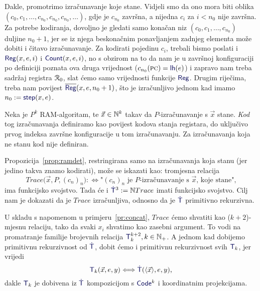 Dakle, promotrimo izračunavanje koje stane. Vidjeli smo da ono mora biti oblika $(c_0,c_1,\dotsc,c_{n_0},c_{n_0},c_{n_0},\dotsc)$, gdje je $c_{n_0}$ završna, a nijedna $c_i$ za $i<n_0$ nije završna. Za potrebe kodiranja, dovoljno je gledati samo konačan niz $(c_0,c_1,\dotsc,c_{n_0})$ duljine $n_0+1$, jer se iz njega beskonačnim ponavljanjem zadnjeg elementa može dobiti i čitavo izračunavanje. Za kodirati pojedinu $c_i$, trebali bismo poslati i $\f{Reg}(x,e,i)$ i $\f{Count}(x,e,i)$, no s obzirom na to da nam je u završnoj konfiguraciji po definiciji poznata ova druga vrijednost ($c_{n_0}(\textsc{pc})=\f{lh}(e)$) i zapravo nam treba sadržaj registra $\mathcal R_{0}$, slat ćemo samo vrijednosti funkcije $\f{Reg}$. Drugim riječima, treba nam povijest $\overline{\f{Reg}}(x,e,n_0+1)$, što je izračunljivo jednom kad imamo $n_0:=\f{step}(x,e)$.

\begin{definicija}\label{def:kodizr}
Neka je $P^k$ RAM-algoritam, te $\vec x\in{\mathbb N}^k$ takav da $P$-izračunavanje s $\vec x$ stane. \emph{Kod} tog izračunavanja definiramo kao povijest kodova stanja registara, do uključivo prvog indeksa završne konfiguracije u tom izračunavanju. Za izračunavanja koja ne stanu kod nije definiran.
\end{definicija}

Propozicija~\ref{prop:ramdet}, restringirana samo na izračunavanja koja stanu (jer jedino takva znamo kodirati), može se iskazati kao: tromjesna relacija \begin{equation}\label{eq:Trace}
    Trace\bigl(\vec x,P,(c_n)_n\bigr):\Longleftrightarrow\text{"$(c_n)_n$ je $P$-izračunavanje s $\vec x$, koje stane",}
\end{equation}
ima funkcijsko svojstvo. Tada će i $\f{\dot T}^3:=\N Trace$ imati funkcijsko svojstvo. Cilj nam je dokazati da je $Trace$ izračunljiva, odnosno da je $\f{\dot T}$ primitivno rekurzivna.

U skladu s napomenom u primjeru~\ref{pr:concat}, $Trace$ ćemo shvatiti kao ($k+2$)-mjesnu relaciju, tako da svaki $x_i$ shvatimo kao zasebni argument. To vodi na promatranje familije brojevnih relacija $\f T_k^{k+2},k\in\N_+$. A jednom kad dobijemo primitivnu rekurzivnost od $\f{\dot T}$, dobit ćemo i primitivnu rekurzivnost svih $\f T_k$, jer vrijedi
\begin{equation}\label{eq:TkviadotT}
\f T_k(\vec x,e,y)\Longleftrightarrow\f{\dot T}(\langle\vec x\rangle,e,y)\text,
\end{equation}
dakle $\f T_k$ je dobivena iz $\f{\dot T}$ kompozicijom s $\f{Code}^k$ i koordinatnim projekcijama.


